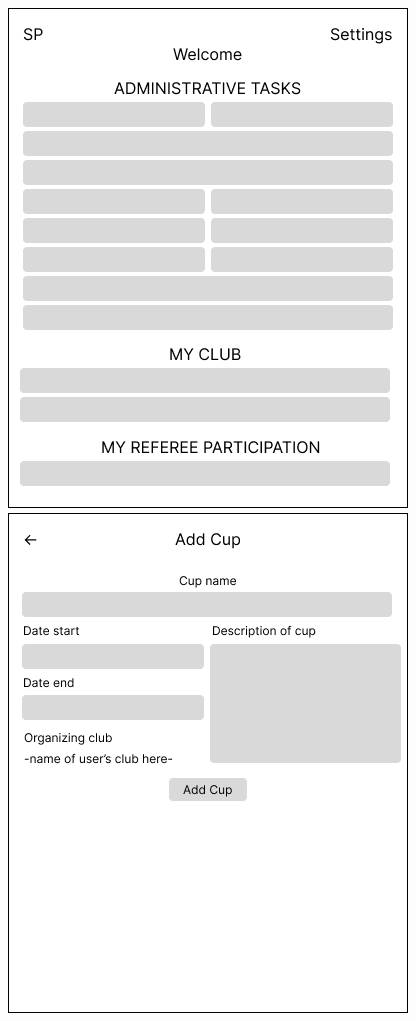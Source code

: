\newline
\includegraphics[scale=0.507]{img/A-administrace.png}
\includegraphics[scale=0.507]{img/A-new-cup.png}
\newline
